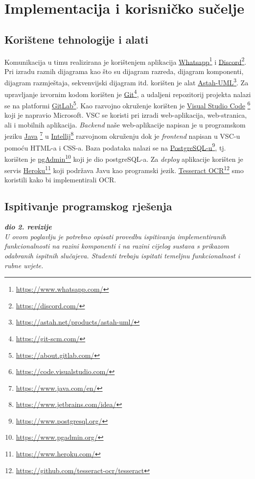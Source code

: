 \chapter{Implementacija i korisničko sučelje}
		
		
		\section{Korištene tehnologije i alati}
		
			 Komunikacija u timu realizirana je korištenjem aplikacija \underline{Whatsapp}\footnote{\url{https://www.whatsapp.com/}} i \underline{Discord}\footnote{\url{https://discord.com/}}. Pri izradu raznih dijagrama kao što su dijagram razreda, dijagram komponenti, dijagram razmještaja, sekvenvijski dijagram itd. korišten je alat \underline{Astah-UML}\footnote{\url{https://astah.net/products/astah-uml/}}.
			 Za upravljanje izvornim kodom korišten je \underline{Git}\footnote{\url{https://git-scm.com/}}, a udaljeni repozitorij projekta nalazi se na platformi \underline{GitLab}\footnote{\url{https://about.gitlab.com/}}.
			 Kao razvojno okruženje korišten je \underline{Visual Studio Code} \footnote{\url{https://code.visualstudio.com/}} koji je napravio Microsoft. VSC se koristi pri izradi web-aplikacija, web-stranica, ali i mobilnih aplikacija.
			 \textit{Backend} naše web-aplikacije napisan je u programskom jeziku \underline{Java} \footnote{\url{https://www.java.com/en/}} u \underline{Intellij}\footnote{\url{https://www.jetbrains.com/idea/}} razvojnom okruženju dok je \textit{frontend} napisan u VSC-u pomoću HTML-a i CSS-a. Baza podataka nalazi se na \underline{PostgreSQL-u}\footnote{\url{https://www.postgresql.org/}}, tj. korišten je \underline{pgAdmin}\footnote{\url{https://www.pgadmin.org/}} koji je dio postgreSQL-a. Za \textit{deploy} aplikacije korišten je servis \underline{Heroku}\footnote{\url{https://www.heroku.com/}} koji podržava Javu kao programski jezik. \underline{Tesseract OCR}\footnote{\url{https://github.com/tesseract-ocr/tesseract}} smo koristili kako bi implementirali OCR.
			
			\eject 
		
	
		\section{Ispitivanje programskog rješenja}
			
			\textbf{\textit{dio 2. revizije}}\\
			
			 \textit{U ovom poglavlju je potrebno opisati provedbu ispitivanja implementiranih funkcionalnosti na razini komponenti i na razini cijelog sustava s prikazom odabranih ispitnih slučajeva. Studenti trebaju ispitati temeljnu funkcionalnost i rubne uvjete.}
	
